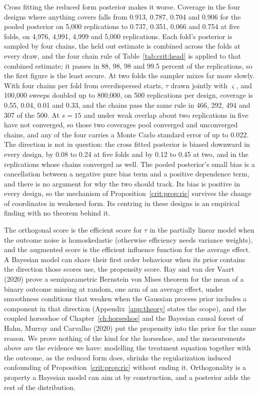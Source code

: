 Cross fitting the reduced form posterior makes it worse. Coverage in the four designs where anything covers falls from 0.913, 0.787, 0.704 and 0.906 for the pooled posterior on 5,000 replications to 0.737, 0.351, 0.066 and 0.754 at five folds, on 4,976, 4,991, 4,999 and 5,000 replications. Each fold's posterior is sampled by four chains, the held out estimate is combined across the folds at every draw, and the four chain rule of Table~\ref{tab:crit:head} is applied to that combined estimate; it passes in 88, 98, 98 and 99.5 percent of the replications, so the first figure is the least secure. At two folds the sampler mixes far more slowly. With four chains per fold from overdispersed starts, $\tau$ drawn jointly with $\varsigma$, and 100,000 sweeps doubled up to 800,000, on 500 replications per design, coverage is 0.55, 0.04, 0.01 and 0.33, and the chains pass the same rule in 466, 292, 494 and 307 of the 500. At $s = 15$ and under weak overlap about two replications in five have not converged, so those two coverages pool converged and unconverged chains, and any of the four carries a Monte Carlo standard error of up to 0.022. The direction is not in question: the cross fitted posterior is biased downward in every design, by 0.08 to 0.24 at five folds and by 0.12 to 0.45 at two, and in the replications whose chains converged as well. The pooled posterior's small bias is a cancellation between a negative pure bias term and a positive dependence term, and there is no argument for why the two should track. Its bias is positive in every design, so the mechanism of Proposition~\ref{crit:prop:ric} survives the change of coordinates in weakened form. Its centring in these designs is an empirical finding with no theorem behind it.

The orthogonal score is the efficient score for $\tau$ in the partially linear model when the outcome noise is homoskedastic (otherwise efficiency needs variance weights), and the augmented score is the efficient influence function for the average effect. A Bayesian model can share their first order behaviour when its prior contains the direction those scores use, the propensity score. Ray and van der Vaart (2020) prove a semiparametric Bernstein von Mises theorem for the mean of a binary outcome missing at random, one arm of an average effect, under smoothness conditions that weaken when the Gaussian process prior includes a component in that direction (Appendix~\ref{app:theory} states the scope), and the coupled horseshoe of Chapter~\ref{ch:horseshoe} and the Bayesian causal forest of Hahn, Murray and Carvalho (2020) put the propensity into the prior for the same reason. We prove nothing of the kind for the horseshoe, and the measurements above are the evidence we have: modelling the treatment equation together with the outcome, as the reduced form does, shrinks the regularization induced confounding of Proposition~\ref{crit:prop:ric} without ending it. Orthogonality is a property a Bayesian model can aim at by construction, and a posterior adds the rest of the distribution.

